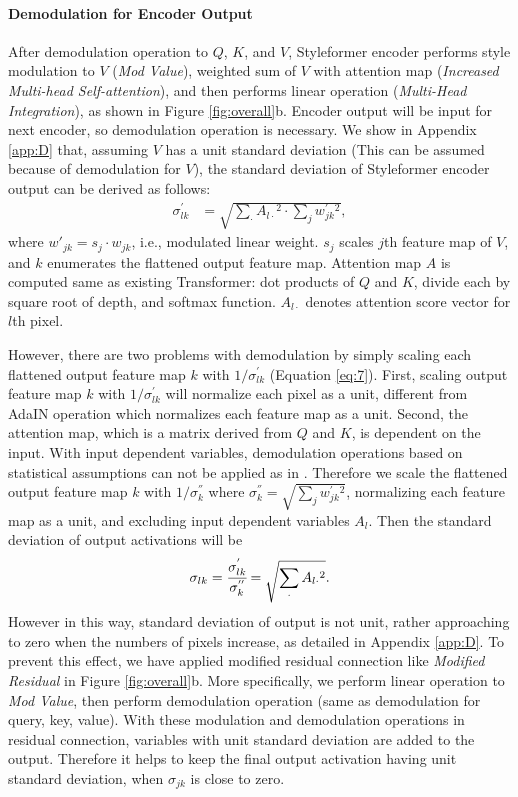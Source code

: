 \documentclass[10pt,twocolumn,letterpaper]{article}
\begin{document}
\paragraph{Demodulation for Encoder Output}
After demodulation operation to $Q$, $K$, and $V$, Styleformer encoder performs style modulation to $V$ (\textit{Mod Value}), weighted sum of $V$ with attention map (\textit{Increased Multi-head Self-attention}), and then performs linear operation (\textit{Multi-Head Integration}), as shown in Figure \ref{fig:overall}b. Encoder output will be input for next encoder, so demodulation operation is necessary.
We show in Appendix \ref{app:D} that, assuming $V$ has a unit standard deviation (This can be assumed because of demodulation for $V$), the standard deviation of Styleformer encoder output can be derived as follows:
\begin{align}
    \label{eq:7}
    \sigma^{'}_{lk} &= \sqrt{\sum_{\cdot}{A_{l\cdot}{^2}} \cdot \sum_{j}{w^{'}_{jk}{^2}}},
\end{align}
where $w'_{jk} = s_j \cdot w_{jk}$, i.e., modulated linear weight. $s_{j}$ scales $j$th feature map of $V$, and $k$ enumerates the flattened output feature map. Attention map $A$ is computed same as existing Transformer: dot products of $Q$ and $K$, divide each by square root of depth, and softmax function. $A_{l \cdot}$ denotes attention score vector for $l$th pixel. 


However, there are two problems with demodulation by simply scaling each flattened output feature map $k$ with $1/\sigma^{'}_{lk}$ (Equation \ref{eq:7}).
First, scaling output feature map $k$ with $1/\sigma^{'}_{lk}$ will normalize each pixel as a unit, different from AdaIN operation which normalizes each feature map as a unit.
Second, the attention map, which is a matrix derived from $Q$ and $K$, is dependent on the input. With input dependent variables, demodulation operations based on statistical assumptions can not be applied as in \cite{pmlr-v9-glorot10a}. Therefore we scale the flattened output feature map $k$ with $1/\sigma^{''}_{k}$ where
    $\sigma^{''}_{k} = \sqrt{\sum_{j}{w^{'}_{jk}{^2}}}$, normalizing each feature map as a unit, and excluding input dependent variables $A_{l}$. Then the standard deviation of output activations will be 
\begin{align}
    \sigma_{lk} = \cfrac{\sigma^{'}_{lk}}{\sigma^{''}_{k}} =  \sqrt{\sum_{\cdot}{A_{l\cdot}{^2}}}.
\end{align}
However in this way, standard deviation of output is not unit, rather approaching to zero when the numbers of pixels increase, as detailed in Appendix \ref{app:D}.
To prevent this effect, we have applied modified residual connection like \textit{Modified Residual} in Figure \ref{fig:overall}b. More specifically, we perform linear operation to \textit{Mod Value}, then perform demodulation operation (same as demodulation for query, key, value). With these modulation and demodulation operations in residual connection, variables with unit standard deviation are added to the output. Therefore it helps to keep the final output activation having unit standard deviation, when $\sigma_{jk}$ is close to zero.
\end{document}
